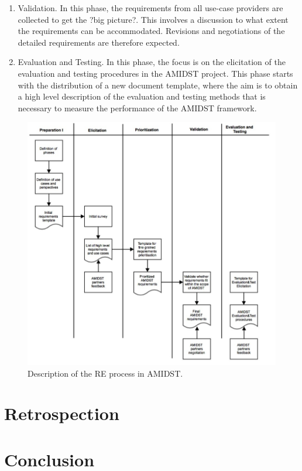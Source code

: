 \documentclass[11pt, oneside]{article}   	%
\begin{document}
\begin{enumerate}
 \item Validation. In this phase, the requirements from all use-case providers are collected to get the ?big picture?.  This involves a discussion to what extent the requirements can be accommodated. Revisions and negotiations of the detailed requirements are therefore expected.  
 \item Evaluation and Testing. In this phase, the focus is on the elicitation of the evaluation and testing procedures in the AMIDST project. This phase starts with the distribution of a new document template, where the aim is to obtain a high level description of the evaluation and testing methods that is necessary to measure the performance of the AMIDST framework.
\end{enumerate}

\begin{figure}
\centering
\includegraphics [keepaspectratio,width = 14cm] {REprocess1}
\caption{Description of the RE process in AMIDST.}
\label{REprocess1}
\end{figure}

\section{Retrospection}
\label{sec:retrospection}

\section{Conclusion}
\label{sec:conclusion}



\end{document}
